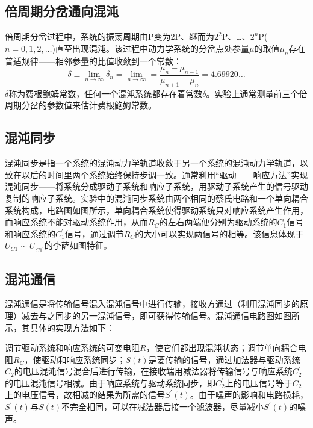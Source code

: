 \documentclass[a4paper, 1.5lines]{ctexart}
\begin{document}
    \subsection{倍周期分岔通向混沌}
    
    倍周期分岔过程中，系统的振荡周期由P变为2P、继而为$2^2$P、\dots、$2^n$P($n=0,1,2,\dots$)直至出现混沌。该过程中动力学系统的分岔点处参量$\mu$的取值$\mu_n$存在普适规律——相邻参量的比值收敛到一个常数：
    \begin{equation}
        \delta \equiv \lim_{n\to\infty}\delta_n = \lim_{n\to\infty} = \dfrac{\mu_n - \mu_{n-1}}{\mu_{n+1}-\mu_n} = 4.69920\dots
    \end{equation}
    $\delta$称为费根鲍姆常数，任何一个混沌系统都存在着常数$\delta$。实验上通常测量前三个倍周期分岔的参数值来估计费根鲍姆常数。
    
    
    
    \subsection{混沌同步}
    
    混沌同步是指一个系统的混沌动力学轨道收敛于另一个系统的混沌动力学轨道，以致在以后的时间里两个系统始终保持步调一致。通常利用“驱动——响应方法”实现混沌同步——将系统分成驱动子系统和响应子系统，用驱动子系统产生的信号驱动复制的响应子系统。实验中的混沌同步系统由两个相同的蔡氏电路和一个单向耦合系统构成，电路图如图所示，单向耦合系统使得驱动系统只对响应系统产生作用，而响应系统不能对驱动系统作用，从而$R_C$的左右两端便分别为驱动系统的$C_1$信号和响应系统的$C_1^\prime$信号，通过调节$R_C$的大小可以实现两信号的相等。该信息体现于$U_{C1}\sim U_{C1^\prime}$的李萨如图特征。
    
    
    \subsection{混沌通信}
    
    混沌通信是将传输信号混入混沌信号中进行传输，接收方通过（利用混沌同步的原理）减去与之同步的另一混沌信号，即可获得传输信号。混沌通信电路图如图所示，其具体的实现方法如下：
    
    调节驱动系统和响应系统的可变电阻$R$，使它们都出现混沌状态；调节单向耦合电阻$R_C$，使驱动和响应系统同步；$S(t)$是要传输的信号，通过加法器与驱动系统$C_2$的电压混沌信号混合后进行传输，在接收端用减法器将传输信号与响应系统$C_2 ^\prime$的电压混沌信号相减。由于响应系统与驱动系统同步，即$C_2 ^\prime$上的电压信号等于$C_2$上的电压信号，故相减的结果为所需的信号$S^\prime(t)$。由于噪声的影响和电路损耗，$S^\prime(t)$与$S(t)$不完全相同，可以在减法器后接一个滤波器，尽量减小$S^\prime(t)$的噪声。
\end{document}
